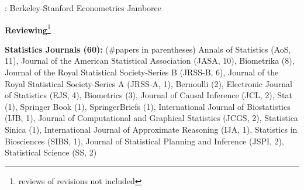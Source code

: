 \documentclass{article}
\begin{document}
\vspace{4mm}
: Berkeley-Stanford Econometrics Jamboree
 











\vspace{7mm}
\begin{large}
\noindent \textbf{Reviewing}\footnote{reviews of revisions not included}
\end{large}

\vspace{2mm}
\noindent \textbf{Statistics Journals (60): }(\#papers in parentheses) Annals of Statistics (AoS, 11), Journal of the American Statistical Association (JASA, 10), Biometrika (8), Journal of the Royal Statistical Society-Series B (JRSS-B, 6), Journal of the Royal Statistical Society-Series A (JRSS-A, 1), Bernoulli (2), Electronic Journal of Statistics (EJS, 4), Biometrics (3), Journal of Causal Inference (JCL, 2), Stat (1), Springer Book (1), SpringerBriefs (1), International Journal of Biostatistics (IJB, 1), Journal of Computational and Graphical Statistics (JCGS, 2), Statistica Sinica (1), International Journal of Approximate Reasoning (IJA, 1), Statistics in Biosciences (SIBS, 1), Journal of Statistical Planning and Inference (JSPI, 2), Statistical Science (SS, 2)
\end{document}
